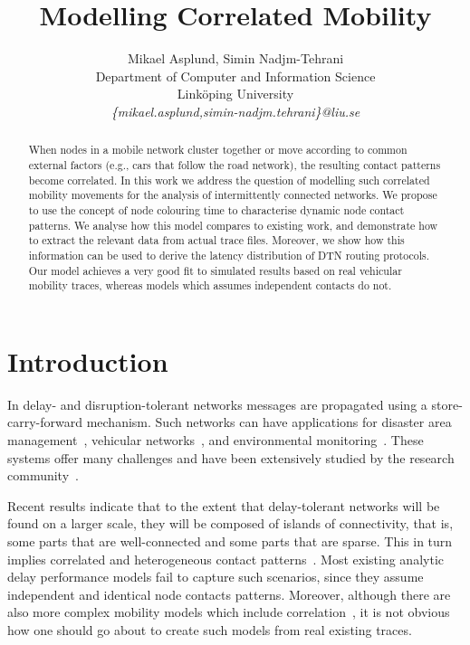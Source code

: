 \documentclass{article}
\title{Modelling Correlated Mobility}
\author{Mikael Asplund, Simin Nadjm-Tehrani\\Department of Computer and Information Science\\
Link{\"o}ping University\\
\emph{\{mikael.asplund,simin-nadjm.tehrani\}@liu.se}}
\begin{document}
\date{}
\maketitle


\begin{abstract}
  When nodes in a mobile network cluster together or move according to common external factors (e.g., cars that follow the road network), the resulting contact patterns become correlated. In this work we address the question of modelling such correlated mobility movements for the analysis of intermittently connected networks. We propose to use the concept of node colouring time to characterise dynamic node contact patterns. We analyse how this model compares to existing work, and demonstrate how to extract the relevant data from actual trace files. Moreover, we show how this information can be used to derive the latency distribution of DTN routing protocols. Our model achieves a very good fit to simulated results based on real vehicular mobility traces, whereas models which assumes independent contacts do not.
\end{abstract}

\section{Introduction}
\label{sec:introduction}

In delay- and disruption-tolerant networks messages are propagated
using a store-carry-forward mechanism.  Such networks can have
applications for disaster area management~\cite{asplund09srds},
vehicular networks~\cite{lu10}, and environmental
monitoring~\cite{lahde07}. These systems offer many challenges and
have been extensively studied by the research
community~\cite{altman10,resta11,spyropoulos08,zhang07}.

Recent results indicate that to the extent that delay-tolerant
networks will be found on a larger scale, they will be composed of
islands of connectivity, that is, some parts that are well-connected
and some parts that are sparse. This in turn implies correlated and
heterogeneous contact patterns~\cite{aschenbruck10,hossmann11}. Most
existing analytic delay performance models fail to capture such
scenarios, since they assume independent and identical node contacts
patterns. Moreover, although there are also more complex mobility
models which include correlation~\cite{ciullo11,garetto07}, it is not
obvious how one should go about to create such models from real
existing traces.
\end{document}
